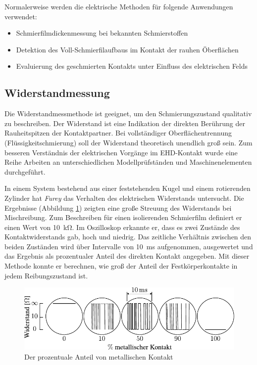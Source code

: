 Normalerweise werden die elektrische Methoden für folgende Anwendungen verwendet:
\begin{itemize}
    \item Schmierfilmdickenmessung bei bekannten Schmierstoffen
    \item Detektion des Voll-Schmierfilaufbaus im Kontakt der rauhen Öberflächen
    \item Evaluierung des geschmierten Kontakts unter Einfluss des elektrischen Felds
\end{itemize}

\subsection{Widerstandmessung}
\label{sub:wiederstandmessung}

Die Widerstandmessmethode ist geeignet, um den Schmierungszustand qualitativ zu beschreiben.
Der Widerstand ist eine Indikation der direkten Berührung der Rauheitspitzen der Kontaktpartner.
Bei vollständiger Oberflächentrennung (Flüssigkeitschmierung) soll der Widerstand theoretisch unendlich groß sein.
Zum besseren Verständnis der elektrischen Vorgänge im EHD-Kontakt wurde eine Reihe Arbeiten an unterschiedlichen Modellprüfständen und Maschinenelementen durchgeführt.

In einem System bestehend aus einer feststehenden Kugel und einem rotierenden Zylinder hat \textit{Furey} \cite{furey_1961} das Verhalten des elektrischen Widerstands untersucht.
Die Ergebnisse (Abbildung \ref{fig:resistance_vs_time_furey}) zeigten eine große Streuung des Widerstands bei Mischreibung.
Zum Beschreiben für einen isolierenden Schmierfilm definiert er einen Wert von \SI{10}{\kilo\ohm}.
Im Oszilloskop erkannte er, dass es zwei Zustände des Kontaktwiderstands gab, hoch und niedrig.
Das zeitliche Verhältnis zwischen den beiden Zuständen wird über Intervalle von \SI{10}{\milli\second} aufgenommen, ausgewertet und das Ergebnis als prozentualer Anteil des direkten Kontakt angegeben.
Mit dieser Methode konnte er berechnen, wie groß der Anteil der Festkörperkontakte in jedem Reibungszustand ist.
\begin{figure}[htb]
    \centering
    \includegraphics[]{./images/resistance_vs_time_furey.pdf}
    \caption{Der prozentuale Anteil von metallischen Kontakt \cite{furey_1961}}
    \label{fig:resistance_vs_time_furey}
\end{figure}
%

